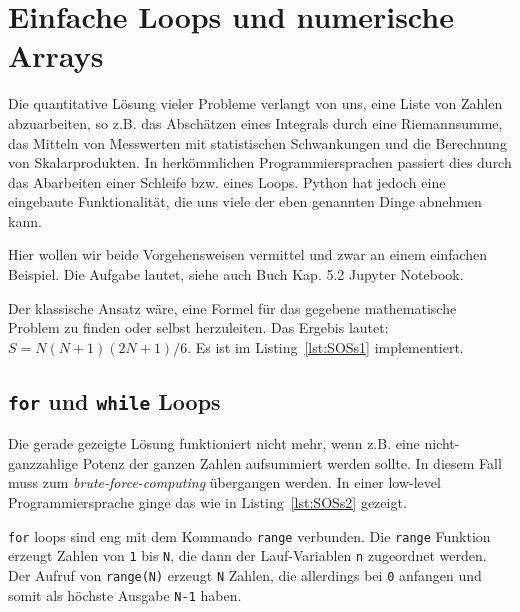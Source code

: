 \chapter{Einfache Loops und numerische Arrays}

Die quantitative Lösung vieler Probleme verlangt von uns, eine Liste von Zahlen abzuarbeiten, so z.B. das Abschätzen eines Integrals durch eine Riemannsumme, das Mitteln von Messwerten mit statistischen Schwankungen und die Berechnung von Skalarprodukten.
%
In herkömmlichen Programmiersprachen passiert dies durch das Abarbeiten einer Schleife bzw. eines Loops.
%
Python hat jedoch eine eingebaute Funktionalität, die uns viele der eben genannten Dinge abnehmen kann. 
%

Hier wollen wir beide Vorgehensweisen vermittel und zwar an einem 
einfachen Beispiel.
%
Die Aufgabe lautet, siehe auch Buch Kap. 5.2 Jupyter Notebook. %

\begin{center}
\end{center}

Der klassische Ansatz wäre, eine Formel für das gegebene mathematische Problem zu finden oder selbst herzuleiten.
%
Das Ergebis lautet: $S = N(N+1)(2N+1)/6$. 
%
Es ist im Listing~\ref{lst:SOSs1} implementiert. 




\section{\texttt{for} und \texttt{while} Loops}

Die gerade gezeigte Lösung funktioniert nicht mehr, wenn z.B. eine nicht-ganzzahlige Potenz der ganzen Zahlen aufsummiert werden sollte.
%
In diesem Fall muss zum \textit{brute-force-computing} übergangen werden.
%
In einer low-level Programmiersprache ginge das wie in Listing~\ref{lst:SOSs2} gezeigt. 



\texttt{for} loops sind eng mit dem Kommando \texttt{range} verbunden.
%
Die \texttt{range} Funktion erzeugt Zahlen von \texttt{1} bis \texttt{N}, die dann der Lauf-Variablen \texttt{n} zugeordnet werden. 
%
Der Aufruf von \texttt{range(N)} erzeugt \texttt{N} Zahlen,  die allerdings bei \texttt{0} anfangen und somit als höchste Ausgabe \texttt{N-1} haben. 

